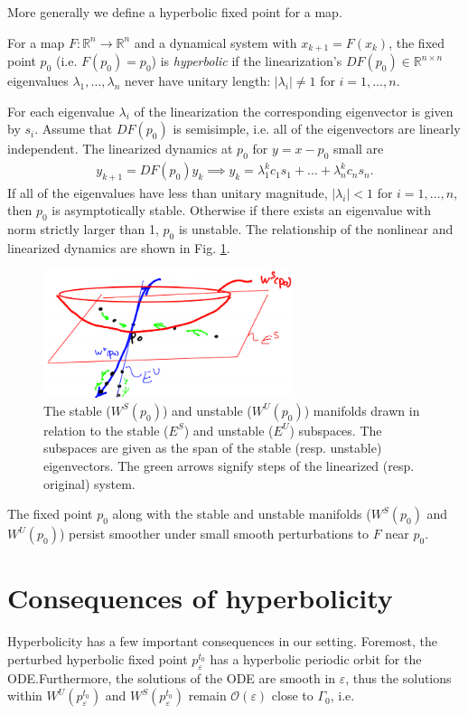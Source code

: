 More generally we define a hyperbolic fixed point for a map.
\begin{definition}
	For a map $F:\mathbb{R}^{n}\to \mathbb{R}^{n}$ and a dynamical system with $x_{k+1} = F(x_k)$, the fixed point $p_0$ (i.e. $F(p_0) = p_0 $) is \emph{hyperbolic} if the linearization's $DF(p_0)\in \mathbb{R}^{n\times n}$ eigenvalues $\lambda_1,\ldots,\lambda_n $ never have unitary length: $|\lambda_i| \neq 1$ for $i=1,\ldots,n$.
\end{definition}

For each eigenvalue $\lambda _i$ of the linearization the corresponding eigenvector is given by $s_i$. Assume that $DF(p_0)$ is semisimple, i.e. all of the eigenvectors are linearly independent. The linearized dynamics at $p_0$ for $y=x-p_0$ small are
\begin{align}
	y_{k+1} = DF(p_0)y_k \implies y_k = \lambda_1^{k} c_1 s_1 + \ldots + \lambda_n^{k} c_n s_n.	
\end{align}
If all of the eigenvalues have less than unitary magnitude, $|\lambda _i|<1$ for $i=1,\ldots,n$, then $p_0$ is asymptotically stable. Otherwise if there exists an eigenvalue with norm strictly larger than 1, $p_0$ is unstable. The relationship of the nonlinear and linearized dynamics are shown in Fig. \ref{fig:lin_nonlin_relation}.
\begin{figure}[h!]
	\centering
	\includegraphics[width=0.65\textwidth]{figures/ch6/9lin_nonlin_relationship.png}
	\caption{The stable ($W^{S}(p_0)$) and unstable ($W^{U}(p_0)$) manifolds drawn in relation to the stable ($E^{S}$) and unstable ($E^{U}$) subspaces. The subspaces are given as the span of the stable (resp. unstable) eigenvectors. The green arrows signify steps of the linearized (resp. original) system.}
	\label{fig:lin_nonlin_relation}
\end{figure}

The fixed point $p_0$ along with the stable and unstable manifolds ($W^{S}(p_0)$ and $W^{U}(p_0)$) persist smoother under small smooth perturbations to $F$ near $p_0$.

\section{Consequences of hyperbolicity}
Hyperbolicity has a few important consequences in our setting. Foremost, the perturbed hyperbolic fixed point $p_{\varepsilon}^{t_0}$ has a hyperbolic periodic orbit for the ODE.Furthermore, the solutions of the ODE are smooth in $\varepsilon$, thus the solutions within $W^{U}(p_{\varepsilon}^{t_0})$ and $W^{S}(p_{\varepsilon}^{t_0})$ remain $\mathcal{O}(\varepsilon)$ close to $\Gamma_0$, i.e.

